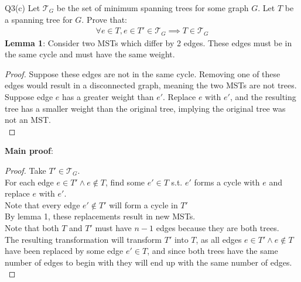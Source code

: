 \begin{problem}
  {Q3(c)}
  Let $\mathcal{T}_G$ be the set of minimum spanning trees for some graph $G$. Let $T$ be a spanning tree for $G$. Prove that:
  \begin{align*}
    \forall e \in T, e \in T' \in \mathcal{T}_G \implies T \in \mathcal{T}_G
  \end{align*}
  \textbf{Lemma 1}: Consider two MSTs which differ by 2 edges. These edges must be in the same cycle and must have the same weight.
  \begin{proof}
    Suppose these edges are not in the same cycle. Removing one of these edges would result in a disconnected graph, meaning the two MSTs are not trees. \\
    Suppose edge $e$ has a greater weight than $e'$. Replace $e$ with $e'$, and the resulting tree has a smaller weight than the original tree, implying
    the original tree was not an MST. \\
  \end{proof}
  \textbf{Main proof}:
  \begin{proof}
    Take $T' \in \mathcal{T}_G$. \\
    For each edge $e \in T' \land e \not\in T$, find some $e' \in T$ s.t. $e'$ forms a cycle with $e$ and replace $e$ with $e'$. \\
    Note that every edge $e' \not\in T'$ will form a cycle in $T'$ \\
    By lemma 1, these replacements result in new MSTs. \\
    Note that both $T$ and $T'$ must have $n-1$ edges because they are both trees. \\
    The resulting transformation will transform $T'$ into $T$, as all edges $e \in T' \land e \not\in T$ have been replaced by
    some edge $e' \in T$, and since both trees have the same number of edges to begin with they will end up with the same number of edges. \\
  \end{proof}
\end{problem}
